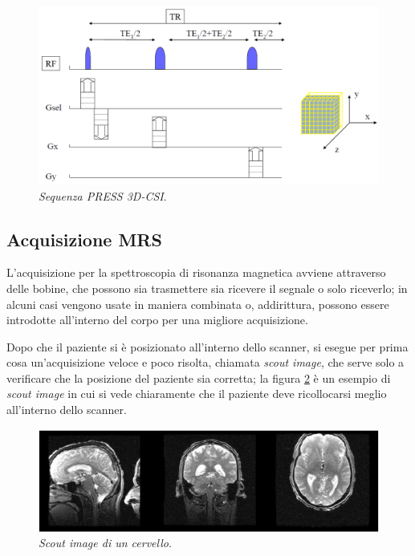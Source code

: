 \documentclass{report}
\newcommand{\figref}[1]{figura \ref{#1}}
\numberwithin{equation}{section}
\numberwithin{figure}{section}
\begin{document}
\begin{figure}[htp]
\centering
\includegraphics[scale=0.6]{immagini/csi3d.png}
\caption{\label{fig:csi3d} \textit{Sequenza PRESS 3D-CSI}.}
\end{figure}

\subsection{Acquisizione MRS}
L'acquisizione per la spettroscopia di risonanza magnetica avviene attraverso delle bobine, che possono sia trasmettere sia ricevere il segnale o solo riceverlo; in alcuni casi vengono usate in maniera combinata o, addirittura, possono essere introdotte all'interno del corpo per una migliore acquisizione.

Dopo che il paziente si è posizionato all'interno dello scanner, si esegue per prima cosa un'acquisizione veloce e poco risolta, chiamata \textit{scout image}, che serve solo a verificare che la posizione del paziente sia corretta; la \figref{fig:scout} è un esempio di \textit{scout image} in cui si vede chiaramente che il paziente deve ricollocarsi meglio all'interno dello scanner.

\begin{figure}[htp]
\centering
\includegraphics[scale=0.7]{immagini/scout.png}
\caption{\label{fig:scout} \textit{Scout image di un cervello}.}
\end{figure}
\end{document}
